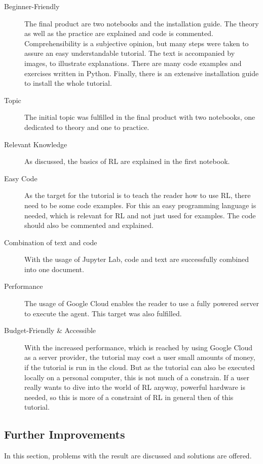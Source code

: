 \documentclass[10pt,a4paper]{article}
\begin{document}
		\begin{description}
		\item[Beginner-Friendly] The final product are two notebooks and the installation guide. The theory as well as the practice are explained and code is commented. 
		Comprehensibility is a subjective opinion, but many steps were taken to assure an easy understandable tutorial.
		The text is accompanied by images, to illustrate explanations.
		There are many code examples and exercises written in Python.
		Finally, there is an extensive installation guide to install the whole tutorial.
		
		\item[Topic] The initial topic was fulfilled in the final product with two notebooks, one dedicated to theory and one to practice. 
		
		\item[Relevant Knowledge] As discussed, the basics of RL are explained in the first notebook.  
		
		\item[Easy Code] As the target for the tutorial is to teach the reader how to use RL, there need to be some code examples. For this an easy programming language is needed, which is relevant for RL and not just used for examples. The code should also be commented and explained.
		
		\item[Combination of text and code] With the usage of Jupyter Lab, code and text are successfully combined into one document. 
		
		\item[Performance] The usage of Google Cloud enables the reader to use a fully powered server to execute the agent. This target was also fulfilled.
		
		\item[Budget-Friendly \& Accessible] With the increased performance, which is reached by using Google Cloud as a server provider, the tutorial may cost a user small amounts of money, if the tutorial is run in the cloud. 
		But as the tutorial can also be executed locally on a personal computer, this is not much of a constrain. 
		If a user really wants to dive into the world of RL anyway, powerful hardware is needed, so this is more of a constraint of RL in general then of this tutorial.
	\end{description}
	\subsection{Further Improvements}
	In this section, problems with the result are discussed and solutions are offered.
	
\end{document}
